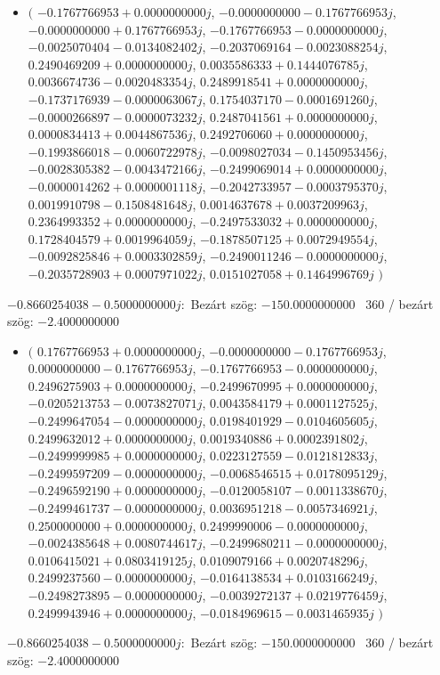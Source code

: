 \documentclass[14pt,a4paper]{article}
\begin{document}
\begin{itemize}
\item
$\big($
$-0.1767766953+0.0000000000j$, $-0.0000000000-0.1767766953j$, $-0.0000000000+0.1767766953j$, $-0.1767766953-0.0000000000j$, $-0.0025070404-0.0134082402j$, $-0.2037069164-0.0023088254j$, $0.2490469209+0.0000000000j$, $0.0035586333+0.1444076785j$, $0.0036674736-0.0020483354j$, $0.2489918541+0.0000000000j$, $-0.1737176939-0.0000063067j$, $0.1754037170-0.0001691260j$, $-0.0000266897-0.0000073232j$, $0.2487041561+0.0000000000j$, $0.0000834413+0.0044867536j$, $0.2492706060+0.0000000000j$, $-0.1993866018-0.0060722978j$, $-0.0098027034-0.1450953456j$, $-0.0028305382-0.0043472166j$, $-0.2499069014+0.0000000000j$, $-0.0000014262+0.0000001118j$, $-0.2042733957-0.0003795370j$, $0.0019910798-0.1508481648j$, $0.0014637678+0.0037209963j$, $0.2364993352+0.0000000000j$, $-0.2497533032+0.0000000000j$, $0.1728404579+0.0019964059j$, $-0.1878507125+0.0072949554j$, $-0.0092825846+0.0003302859j$, $-0.2490011246-0.0000000000j$, $-0.2035728903+0.0007971022j$, $0.0151027058+0.1464996769j$
$\big)$
\end{itemize}
$-0.8660254038-0.5000000000j$:\
Bezárt szög: $-150.0000000000$ \
360 / bezárt szög: $-2.4000000000$\
\begin{itemize}
\item
$\big($
$0.1767766953+0.0000000000j$, $-0.0000000000-0.1767766953j$, $0.0000000000-0.1767766953j$, $-0.1767766953-0.0000000000j$, $0.2496275903+0.0000000000j$, $-0.2499670995+0.0000000000j$, $-0.0205213753-0.0073827071j$, $0.0043584179+0.0001127525j$, $-0.2499647054-0.0000000000j$, $0.0198401929-0.0104605605j$, $0.2499632012+0.0000000000j$, $0.0019340886+0.0002391802j$, $-0.2499999985+0.0000000000j$, $0.0223127559-0.0121812833j$, $-0.2499597209-0.0000000000j$, $-0.0068546515+0.0178095129j$, $-0.2496592190+0.0000000000j$, $-0.0120058107-0.0011338670j$, $-0.2499461737-0.0000000000j$, $0.0036951218-0.0057346921j$, $0.2500000000+0.0000000000j$, $0.2499990006-0.0000000000j$, $-0.0024385648+0.0080744617j$, $-0.2499680211-0.0000000000j$, $0.0106415021+0.0803419125j$, $0.0109079166+0.0020748296j$, $0.2499237560-0.0000000000j$, $-0.0164138534+0.0103166249j$, $-0.2498273895-0.0000000000j$, $-0.0039272137+0.0219776459j$, $0.2499943946+0.0000000000j$, $-0.0184969615-0.0031465935j$
$\big)$
\end{itemize}
$-0.8660254038-0.5000000000j$:\
Bezárt szög: $-150.0000000000$ \
360 / bezárt szög: $-2.4000000000$\
\end{document}
